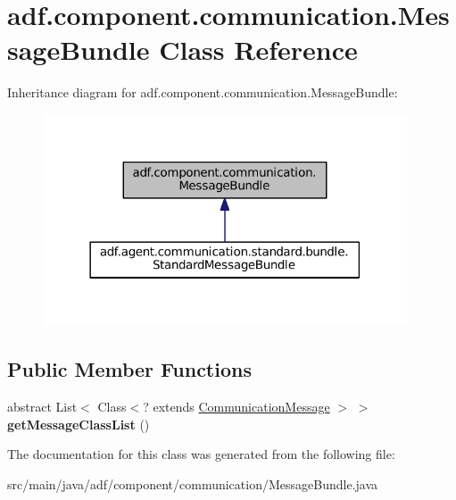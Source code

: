 \hypertarget{classadf_1_1component_1_1communication_1_1MessageBundle}{}\section{adf.\+component.\+communication.\+Message\+Bundle Class Reference}
\label{classadf_1_1component_1_1communication_1_1MessageBundle}


Inheritance diagram for adf.\+component.\+communication.\+Message\+Bundle\+:
\nopagebreak
\begin{figure}[H]
\begin{center}
\leavevmode
\includegraphics[width=306pt]{classadf_1_1component_1_1communication_1_1MessageBundle__inherit__graph}
\end{center}
\end{figure}
\subsection*{Public Member Functions}
\begin{DoxyCompactItemize}
\item 
\hypertarget{classadf_1_1component_1_1communication_1_1MessageBundle_a1c7c92e95af39e483a098cee1ce3c21c}{}\label{classadf_1_1component_1_1communication_1_1MessageBundle_a1c7c92e95af39e483a098cee1ce3c21c} 
abstract List$<$ Class$<$? extends \hyperlink{classadf_1_1component_1_1communication_1_1CommunicationMessage}{Communication\+Message} $>$ $>$ {\bfseries get\+Message\+Class\+List} ()
\end{DoxyCompactItemize}


The documentation for this class was generated from the following file\+:\begin{DoxyCompactItemize}
\item 
src/main/java/adf/component/communication/Message\+Bundle.\+java\end{DoxyCompactItemize}
